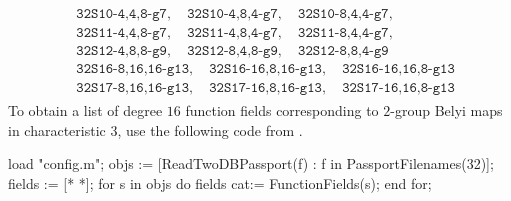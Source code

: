\documentclass{dcthesis}
\numberwithin{equation}{section}
\theoremstyle{definition}
\theoremstyle{remark}
\begin{document}
{{{\begin{align}
\begin{split}
        &\texttt{32S10-4,4,8-g7},\quad
        \texttt{32S10-4,8,4-g7},\quad
        \texttt{32S10-8,4,4-g7},\\
        &\texttt{32S11-4,4,8-g7},\quad
        \texttt{32S11-4,8,4-g7},\quad
        \texttt{32S11-8,4,4-g7},\\
        &\texttt{32S12-4,8,8-g9},\quad
        \texttt{32S12-8,4,8-g9},\quad
        \texttt{32S12-8,8,4-g9}\\
        &\texttt{32S16-8,16,16-g13},\quad
        \texttt{32S16-16,8,16-g13},\quad
        \texttt{32S16-16,16,8-g13}\\
        &\texttt{32S17-8,16,16-g13},\quad
        \texttt{32S17-16,8,16-g13},\quad
        \texttt{32S17-16,16,8-g13}
      \end{split}
    \end{align}
    To obtain a list of degree $16$
    function fields corresponding to
    $2$-group Belyi maps
    in characteristic $3$,
    use the following code from
    \cite{twogroupdessins}.
    \begin{magma}
load "config.m";
objs := [ReadTwoDBPassport(f) : f in PassportFilenames(32)];
fields := [* *];
for s in objs do
  fields cat:= FunctionFields(s);
end for;
    \end{magma}
  }
}}
\end{document}
